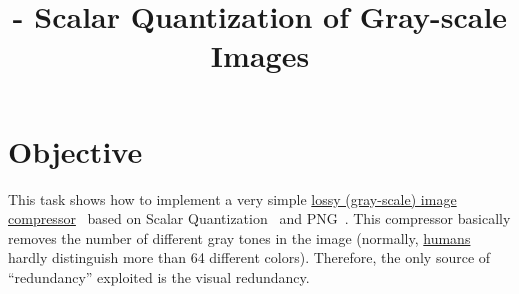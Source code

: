 

\title{\SM{} - Scalar Quantization of Gray-scale Images}

\maketitle
\tableofcontents

\section{Objective}
This task shows how to implement a very simple
\href{https://en.wikipedia.org/wiki/Lossy_compression}{lossy
  (gray-scale) image compressor}~\cite{vruiz__image_IO} based on
Scalar
Quantization~\cite{vruiz__scalar_quantization,sayood2017introduction,vetterli2014foundations}
and PNG~\cite{vruiz__PNG}. This compressor basically removes the
number of different gray tones in the image (normally,
\href{https://en.wikipedia.org/wiki/Visual_system}{humans} hardly
distinguish more than 64 different colors). Therefore, the only source
of ``redundancy'' exploited is the visual redundancy.

